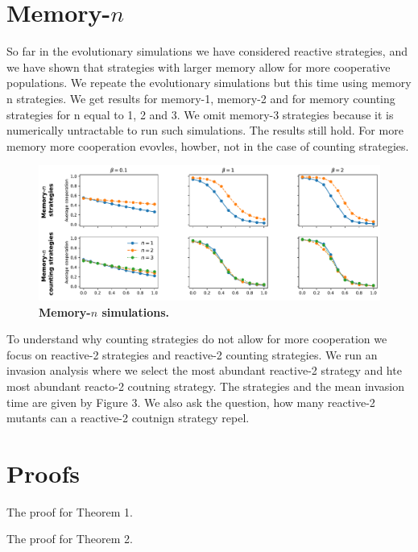 \documentclass[11pt]{article}
\theoremstyle{plainCl1}
\theoremstyle{plainCl2}
\begin{document}
\newpage

\section{Memory-$n$}

So far in the evolutionary simulations we have considered reactive strategies,
and we have shown that strategies with larger memory allow for more cooperative
populations. We repeate the evolutionary simulations but this time using memory
n strategies. We get results for memory-1, memory-2 and for memory counting
strategies for n equal to 1, 2 and 3. We omit memory-3 strategies because it
is numerically untractable to run such simulations. The results still hold.
For more memory more cooperation evovles, howber, not in the case of counting
strategies.

\begin{figure}[t]
  \centering
  \includegraphics[width=\textwidth]{../../figures/siFigMemorySim.pdf}
  \caption{
  \textbf{Memory-$n$ simulations.}}
\end{figure}


To understand why counting strategies do not allow for more cooperation we focus
on reactive-2 strategies and reactive-2 counting strategies. We run an invasion
analysis where we select the most abundant reactive-2 strategy and hte most
abundant reacto-2 coutning strategy. The strategies and the mean invasion
time are given by Figure 3. We also ask the question, how many reactive-2
mutants can a reactive-2 coutnign strategy repel.

\section{Proofs}

The proof for Theorem 1.

The proof for Theorem 2.
\end{document}
